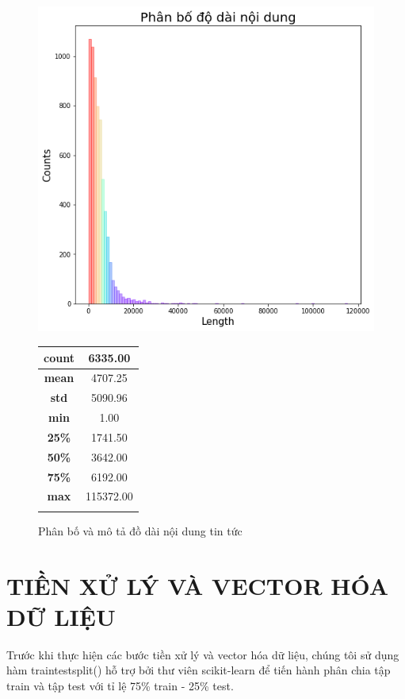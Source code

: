 \documentclass[12pt,a4paper,oneside]{book}
\begin{document}
	  \begin{figure}[!ht]
	  	
	    \centering
	    \includegraphics[width=0.71\columnwidth]{textlen}
	    \qquad
	    \footnotesize
	    \renewcommand{\arraystretch}{2.}
	    \begin{tabular}[b]{cc}\hline
	      \textbf{count} &  6335.00\\ \hline
          \textbf{mean} & 4707.25 \\ \hline
          \textbf{std} & 5090.96 \\ \hline
          \textbf{min} & 1.00 \\ \hline
          \textbf{25\%} & 1741.50 \\ \hline
          \textbf{50\%} & 3642.00 \\ \hline
          \textbf{75\%}  & 6192.00\\ \hline
          \textbf{max} & 115372.00\\ \hline 
          \vspace{2.5em} 
	    \end{tabular}
	    \caption{Phân bố và mô tả đồ dài nội dung tin tức}
	  \end{figure}
	
	
	
	  
	  
	  
	  
	  
	

\chapter{TIỀN XỬ LÝ VÀ VECTOR HÓA DỮ LIỆU}
	
	Trước khi thực hiện các bước tiền xử lý và vector hóa dữ liệu, chúng tôi sử dụng hàm traintestsplit() hỗ trợ bởi thư viên scikit-learn để tiến hành phân chia tập train và tập test với tỉ lệ 75\% train - 25\% test. 
	
\end{document}
